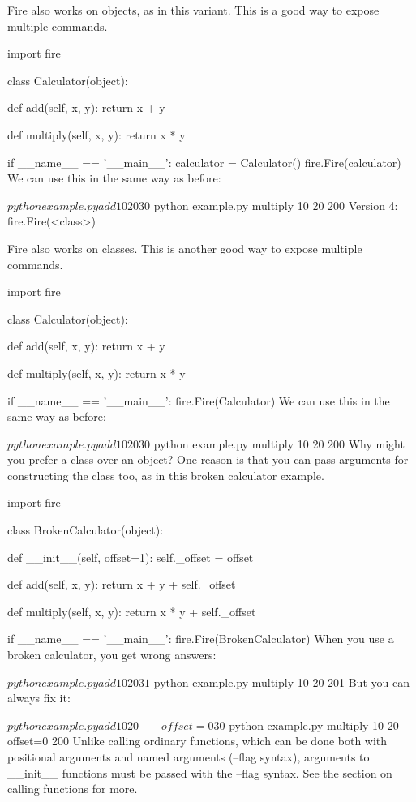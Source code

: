 \documentclass{article}
\begin{document}
Fire also works on objects, as in this variant. This is a good way to expose multiple commands.

import fire

class Calculator(object):

  def add(self, x, y):
    return x + y

  def multiply(self, x, y):
    return x * y

if __name__ == '__main__':
  calculator = Calculator()
  fire.Fire(calculator)
We can use this in the same way as before:

$ python example.py add 10 20
30
$ python example.py multiply 10 20
200
Version 4: fire.Fire(<class>)

Fire also works on classes. This is another good way to expose multiple commands.

import fire

class Calculator(object):

  def add(self, x, y):
    return x + y

  def multiply(self, x, y):
    return x * y

if __name__ == '__main__':
  fire.Fire(Calculator)
We can use this in the same way as before:

$ python example.py add 10 20
30
$ python example.py multiply 10 20
200
Why might you prefer a class over an object? One reason is that you can pass arguments for constructing the class too, as in this broken calculator example.

import fire

class BrokenCalculator(object):

  def __init__(self, offset=1):
      self._offset = offset

  def add(self, x, y):
    return x + y + self._offset

  def multiply(self, x, y):
    return x * y + self._offset

if __name__ == '__main__':
  fire.Fire(BrokenCalculator)
When you use a broken calculator, you get wrong answers:

$ python example.py add 10 20
31
$ python example.py multiply 10 20
201
But you can always fix it:

$ python example.py add 10 20 --offset=0
30
$ python example.py multiply 10 20 --offset=0
200
Unlike calling ordinary functions, which can be done both with positional arguments and named arguments (--flag syntax), arguments to __init__ functions must be passed with the --flag syntax. See the section on calling functions for more.
\end{document}
